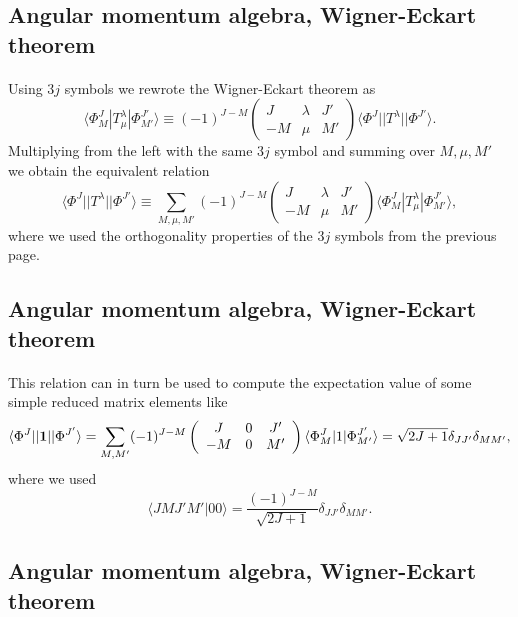 \documentclass[%
twoside,                 %
final,                   %
10pt]{article}
\begin{document}
\subsection{Angular momentum algebra, Wigner-Eckart theorem}

\paragraph{}
Using $3j$ symbols we rewrote the Wigner-Eckart theorem as
\[
\langle \Phi^J_M|T^{\lambda}_{\mu}|\Phi^{J'}_{M'}\rangle\equiv(-1)^{J-M}\left(\begin{array}{ccc}  J & \lambda & J' \\ -M & \mu & M'\end{array}\right)\langle \Phi^J||T^{\lambda}||\Phi^{J'}\rangle.
\]
Multiplying from the left with the same $3j$ symbol and summing over $M,\mu,M'$ we obtain the equivalent relation 
\[
\langle \Phi^J||T^{\lambda}||\Phi^{J'}\rangle\equiv\sum_{M,\mu,M'}(-1)^{J-M}\left(\begin{array}{ccc}  J & \lambda & J' \\ -M & \mu & M'\end{array}\right)\langle \Phi^J_M|T^{\lambda}_{\mu}|\Phi^{J'}_{M'}\rangle,
\]
where we used the orthogonality properties of the $3j$ symbols from the previous page.


\subsection{Angular momentum algebra, Wigner-Eckart theorem}

\paragraph{}
This relation can in turn be used to compute the expectation value of some simple reduced matrix elements like
\[
\langle \Phi^J||{\bf 1}||\Phi^{J'}\rangle=\sum_{M,M'}(-1)^{J-M}\left(\begin{array}{ccc}  J & 0 & J' \\ -M & 0 & M'\end{array}\right)\langle \Phi^J_M|1|\Phi^{J'}_{M'}\rangle=\sqrt{2J+1}\delta_{JJ'}\delta_{MM'},
\]
where we used
\[
\langle JM J'M' |00\rangle =\frac{(-1)^{J-M}}{\sqrt{2J+1}}\delta_{JJ'}\delta_{MM'}.
\]


\subsection{Angular momentum algebra, Wigner-Eckart theorem}
\end{document}
